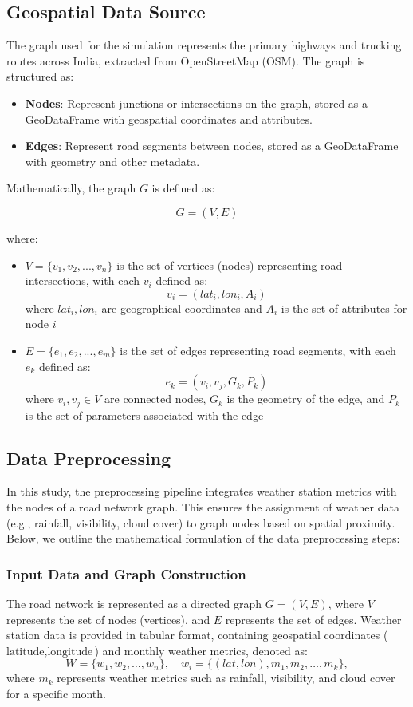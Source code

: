 \documentclass[sigplan,screen]{acmart}
\begin{document}
\subsection{Geospatial Data Source}
The graph used for the simulation represents the primary highways and trucking routes across India, extracted from OpenStreetMap (OSM). The graph is structured as:

\begin{itemize}
    \item \textbf{Nodes}: Represent junctions or intersections on the graph, stored as a GeoDataFrame with geospatial coordinates and attributes.
    \item \textbf{Edges}: Represent road segments between nodes, stored as a GeoDataFrame with geometry and other metadata.
\end{itemize}

Mathematically, the graph $G$ is defined as:

\[G = (V, E)\]

where:
\begin{itemize}
    \item $V = \{v_1, v_2, ..., v_n\}$ is the set of vertices (nodes) representing road intersections, with each $v_i$ defined as:
    \[v_i = (lat_i, lon_i, A_i)\]
    where $lat_i, lon_i$ are geographical coordinates and $A_i$ is the set of attributes for node $i$
    
    \item $E = \{e_1, e_2, ..., e_m\}$ is the set of edges representing road segments, with each $e_k$ defined as:
    \[e_k = (v_i, v_j, G_k, P_k)\]
    where $v_i, v_j \in V$ are connected nodes, $G_k$ is the geometry of the edge, and $P_k$ is the set of parameters associated with the edge
\end{itemize}

\subsection{Data Preprocessing}

In this study, the preprocessing pipeline integrates weather station metrics with the nodes of a road network graph. This ensures the assignment of weather data (e.g., rainfall, visibility, cloud cover) to graph nodes based on spatial proximity. Below, we outline the mathematical formulation of the data preprocessing steps:

\subsubsection{Input Data and Graph Construction}
The road network is represented as a directed graph \( G = (V, E) \), where \( V \) represents the set of nodes (vertices), and \( E \) represents the set of edges. Weather station data is provided in tabular format, containing geospatial coordinates (\(\text{latitude}, \text{longitude}\)) and monthly weather metrics, denoted as:
\[
W = \{w_1, w_2, \dots, w_n\}, \quad w_i = \{(lat, lon), m_1, m_2, \dots, m_k\},
\]
where \(m_k\) represents weather metrics such as rainfall, visibility, and cloud cover for a specific month.
\end{document}
